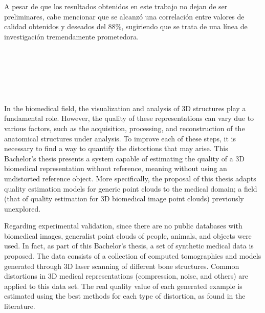 A pesar de que los resultados obtenidos en este trabajo no dejan de ser preliminares, 
cabe mencionar que se alcanzó una correlación entre valores de calidad obtenidos y 
deseados del 88\%, sugiriendo que se trata de una línea de investigación tremendamente 
prometedora. 

\cleardoublepage


\thispagestyle{empty}


\begin{center}
{\large\bfseries \myTitleENG}\\
\end{center}
\begin{center}
\myName \\
\end{center}

\\

\\
In the biomedical field, the visualization and analysis of 3D structures 
play a fundamental role. However, the quality of these representations can vary 
due to various factors, such as the acquisition, processing, and reconstruction 
of the anatomical structures under analysis. To improve each of these steps, 
it is necessary to find a way to quantify the distortions that may arise. 
This Bachelor's thesis presents a system capable of estimating the quality of 
a 3D biomedical representation without reference, meaning without using an 
undistorted reference object. 
More specifically, the proposal of this thesis adapts quality estimation models for generic 
point clouds to the medical domain; a field (that of quality estimation for 3D biomedical image point clouds) previously unexplored.
\smallskip

Regarding experimental validation, since there are no public databases with 
biomedical images, generalist point clouds of people, animals, and objects were used. 
In fact, as part of this Bachelor's thesis, a set of synthetic medical data is 
proposed. The data consists of a collection of computed tomographies and models 
generated through 3D laser scanning of different bone structures. Common distortions 
in 3D medical representations (compression, noise, and others) are applied to this 
data set. The real quality value of each generated example is estimated using 
the best methods for each type of distortion, as found in the literature.
\smallskip

